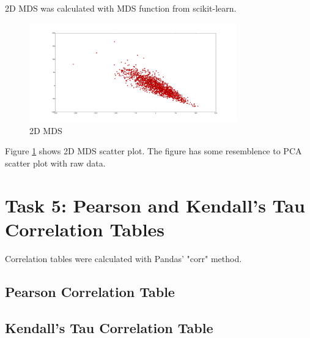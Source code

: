 \documentclass[12pt]{article}
\begin{document}
2D MDS was calculated with MDS function from scikit-learn.

\begin{figure}[H]
    \centering
    \includegraphics[width=0.8\textwidth]{2d_mds}
    \caption{2D MDS}
    \label{fig:mds}
\end{figure}

Figure \ref{fig:mds} shows 2D MDS scatter plot. The figure has some resemblence to PCA scatter plot with raw data. 

\section{Task 5: Pearson and Kendall's Tau Correlation Tables}

Correlation tables were calculated with Pandas' "corr" method.

\subsection{Pearson Correlation Table}

\resizebox{\linewidth}{!}{%



}

\subsection{Kendall's Tau Correlation Table}

\resizebox{\linewidth}{!}{%



}
\end{document}
